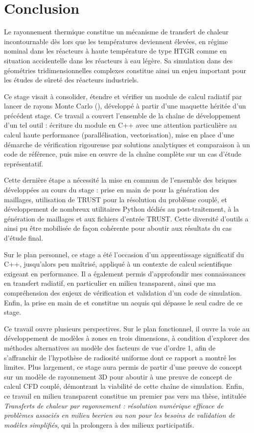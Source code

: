 

\chapter*{Conclusion}

Le rayonnement thermique constitue un mécanisme de transfert de chaleur incontournable dès lors que les températures deviennent élevées, en régime nominal dans les réacteurs à haute température de type HTGR comme en situation accidentelle dans les réacteurs à eau légère. Sa simulation dans des géométries tridimensionnelles complexes constitue ainsi un enjeu important pour les études de sûreté des réacteurs industriels.

Ce stage visait à consolider, étendre et vérifier un module de calcul radiatif par lancer de rayons Monte Carlo (\emb), développé à partir d'une maquette héritée d'un précédent stage. Ce travail a couvert l'ensemble de la chaîne de développement d'un tel outil : écriture du module en C++ avec une attention particulière au calcul haute performance (parallélisation, vectorisation), mise en place d'une démarche de vérification rigoureuse par solutions analytiques et comparaison à un code de référence, puis mise en œuvre de la chaîne complète sur un cas d'étude représentatif.

Cette dernière étape a nécessité la mise en commun de l'ensemble des briques développées au cours du stage : prise en main de \salome pour la génération des maillages, utilisation de TRUST pour la résolution du problème couplé, et développement de nombreux utilitaires Python dédiés au post-traitement, à la génération de maillages et aux fichiers d'entrée TRUST. Cette diversité d'outils a ainsi pu être mobilisée de façon cohérente pour aboutir aux résultats du cas d'étude final.

Sur le plan personnel, ce stage a été l'occasion d'un apprentissage significatif du C++, jusqu'alors peu maîtrisé, appliqué à un contexte de calcul scientifique exigeant en performance. Il a également permis d'approfondir mes connaissances en transfert radiatif, en particulier en milieu transparent, ainsi que ma compréhension des enjeux de vérification et validation d'un code de simulation. Enfin, la prise en main de \trust et \salome constitue un acquis qui dépasse le seul cadre de ce stage.

Ce travail ouvre plusieurs perspectives. Sur le plan fonctionnel, il ouvre la voie au développement de modèles à zones en trois dimensions, à condition d'explorer des méthodes alternatives au modèle des facteurs de vue d'ordre 1, afin de s'affranchir de l'hypothèse de radiosité uniforme dont ce rapport a montré les limites. Plus largement, ce stage aura permis de partir d'une preuve de concept sur un modèle de rayonnement 3D pour aboutir à une preuve de concept de calcul CFD couplé, démontrant la viabilité de cette chaîne de simulation. Enfin, ce travail en milieu transparent constitue un premier pas vers ma thèse, intitulée \textit{Transferts de chaleur par rayonnement : résolution numérique efficace de problèmes associés en milieu beerien ou non pour les besoins de validation de modèles simplifiés}, qui la prolongera à des milieux participatifs.